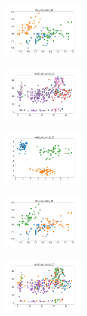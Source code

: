 \begin{figure}[H]
\begin{subfigure}
    \end{subfigure}
    \hfill
    \begin{subfigure}
        \centering
        \includegraphics[width=0.32\textwidth]{img/copkm2/iris_set_const_10_49258669_clust.png}
    \end{subfigure}
    \hfill
    \begin{subfigure}
        \centering
        \includegraphics[width=0.32\textwidth]{img/copkm2/ecoli_set_const_10_49258669_clust.png}
    \end{subfigure}
    \hfill
    \begin{subfigure}
        \centering
        \includegraphics[width=0.32\textwidth]{img/copkm2/rand_set_const_10_49258669_clust.png}
    \end{subfigure}
    \hfill
    \begin{subfigure}
        \centering
        \includegraphics[width=0.32\textwidth]{img/copkm2/iris_set_const_10_3773969821_clust.png}
    \end{subfigure}
    \hfill
    \begin{subfigure}
        \centering
        \includegraphics[width=0.32\textwidth]{img/copkm2/ecoli_set_const_10_3773969821_clust.png}

\end{subfigure}
\end{figure}
